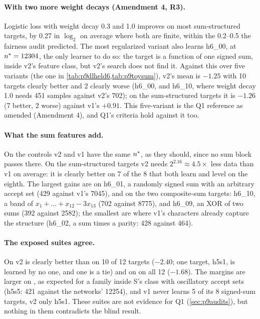 \paragraph{With two more weight decays (Amendment 4, R3).} Logistic loss with weight decay 0.3 and 1.0 improves  on most sum-structured targets, by 0.27 in $\log_2$ on average where both are finite, within the 0.2--0.5 the fairness audit predicted. The most regularized variant also learns h6\_00, at $n^{*}=12304$, the only learner to do so: the target is a function of one signed sum, inside v2's feature class, but v2's search does not find it. Against this  over five variants (the one in \cref{tab:p9dlheld6,tab:p9toysum}), v2's mean is $-1.25$ with 10 targets clearly better and 2 clearly worse (h6\_00, and h6\_10, where weight decay 1.0 needs 451 samples against v2's 702); on the sum-structured targets it is $-1.26$ (7 better, 2 worse) against v1's $+0.91$. This five-variant  is the Q1 reference as amended (Amendment 4), and Q1's criteria hold against it too.

\paragraph{What the sum features add.} On the controls v2 and v1 have the same $n^{*}$, as they should, since no sum block passes there. On the sum-structured targets v2 needs $2^{2.16}\approx4.5\times$ less data than v1 on average: it is clearly better on 7 of the 8 that both learn and level on the eighth. The largest gains are on h6\_01, a randomly signed sum with an arbitrary accept set (429 against v1's 7045), and on the two composite-sum targets: h6\_10, a band of $x_1+\dots+x_{12}-3x_{13}$ (702 against 8775), and h6\_09, an XOR of two sums (392 against 2582); the smallest are where v1's characters already capture the structure (h6\_02, a sum times a parity: 428 against 464).

\paragraph{The exposed suites agree.} On  v2 is clearly better than  on 10 of 12 targets ($-2.40$; one target, h5s1, is learned by no one, and one is a tie) and on  on all 12 ($-1.68$). The margins are larger on , as expected for a family inside S's class with oscillatory accept sets (h5s5: 421 against the networks' 12254), and v1 never learns 5 of its 8 signed-sum targets, v2 only h5s1. These suites are not evidence for Q1 (\cref{sec:p9audits}), but nothing in them contradicts the blind result.

